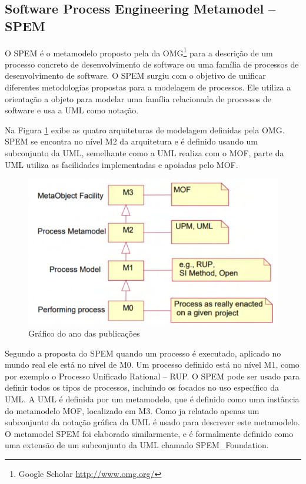 \subsection{Software Process Engineering Metamodel -- SPEM}


O SPEM é o metamodelo proposto pela da OMG\footnote{Google Scholar \url{http://www.omg.org/}} para a descrição de um processo concreto de desenvolvimento de software ou uma família de processos de desenvolvimento de software. O SPEM surgiu com o objetivo de unificar diferentes metodologias propostas para a modelagem de processos. Ele utiliza a orientação a objeto para modelar uma família relacionada de processos de software e usa a UML como notação.

Na Figura \ref{fig:niveisSpem} exibe as quatro arquiteturas de modelagem definidas pela OMG. SPEM se encontra no nível M2 da arquitetura e é definido usando um subconjunto da UML, semelhante como a UML realiza com o MOF, parte da UML utiliza as facilidades implementadas e apoiadas pelo MOF.  

\begin{figure}[!htb]
	\caption{Gráfico do ano das publicações}\label{fig:niveisSpem}
	\begin{center}
		\includegraphics[scale=0.5]{img/spemNiveis}
	\end{center}
\end{figure}

Segundo a proposta do SPEM quando um processo é executado, aplicado no mundo real ele está no nível de M0. Um processo definido está no nível M1, como por exemplo o Processo Unificado Rational -- RUP. O SPEM pode ser usado para definir todos os tipos de processos, incluindo os focados no uso específico da UML. A UML é definida por um metamodelo, que é definido como uma instância do metamodelo MOF, localizado em M3. Como ja relatado apenas um subconjunto da notação gráfica da UML é usado para descrever este metamodelo. O metamodel SPEM foi elaborado similarmente, e é formalmente definido como uma extensão de um subconjunto da UML chamado SPEM\_Foundation. 

